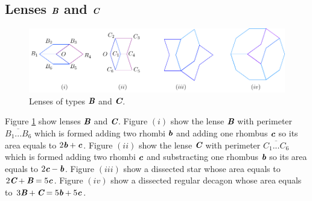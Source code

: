 \documentclass[11pt]{article}
\def\mathbi#1{\textbf{\em #1}}
\begin{document}
\subsection{Lenses $\mathbi{B}$ and $\mathbi{C}$}

\begin{figure}[H]
\centering
\includegraphics[scale=1.1]{bc/hexagons}
\caption{Lenses of types $\mathbi{B}$ and $\mathbi{C}$.}
\label{fig:bc-hexagons}
\end{figure}

Figure \ref{fig:bc-hexagons} show lenses $\mathbi{B}$ and $\mathbi{C}$.
Figure $(i)$ show the lense $\mathbi{B}$ with perimeter $\overline{B_1...B_6}$ which is formed adding two rhombi $\mathbi{b}$ and adding one rhombus $\mathbi{c}$ so its area equals to $2\mathbi{b} + \mathbi{c}$.
Figure $(ii)$ show the lense $\mathbi{C}$ with perimeter $\overline{C_1...C_6}$ which is formed adding two rhombi $\mathbi{c}$ and substracting one rhombus $\mathbi{b}$ so its area equals to $2\mathbi{c} - \mathbi{b}$.
Figure $(iii)$ show a dissected star whose area equals to $2\mathbi{C} + \mathbi{B} = 5\mathbi{c}$.
Figure $(iv)$ show a dissected regular decagon whose area equals to $3\mathbi{B} + \mathbi{C} = 5\mathbi{b} + 5\mathbi{c}$.
\end{document}
